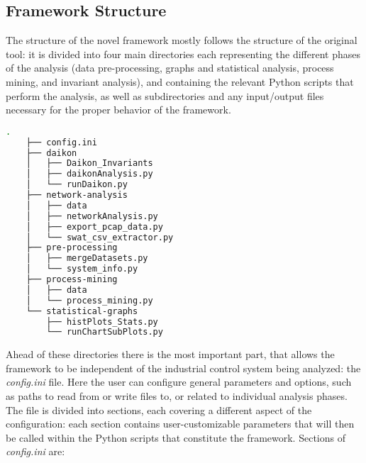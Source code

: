 \subsection{Framework Structure}
\label{subsec:4_framework_struct}
The structure of the novel framework mostly follows the structure of the original tool: it is divided into four main directories each representing the different phases of the analysis (data pre-processing, graphs and statistical analysis, process mining, and invariant analysis), and containing the relevant Python scripts that perform the analysis, as well as subdirectories and any input/output files necessary for the proper behavior of the framework.

\begin{lstlisting}[language=bash, numbers=none, caption=Novel Framework structure and Python scripts, label=lst:4_tree_command]
	.
	├── config.ini
	├── daikon
	│   ├── Daikon_Invariants
	│   ├── daikonAnalysis.py
	│   └── runDaikon.py
	├── network-analysis
	│   ├── data
	│   ├── networkAnalysis.py
	│   ├── export_pcap_data.py
	│   └── swat_csv_extractor.py
	├── pre-processing
	│   ├── mergeDatasets.py
	│   └── system_info.py
	├── process-mining
	│   ├── data
	│   └── process_mining.py
	└── statistical-graphs
	    ├── histPlots_Stats.py
	    └── runChartSubPlots.py
\end{lstlisting}

Ahead of these directories there is the most important part, that allows the framework to be independent of the industrial control system being analyzed: the \textit{config.ini} file. Here the user can configure general parameters and options, such as paths to read from or write files to, or related to individual analysis phases.\newline
The file is divided into sections, each covering a different aspect of 
the configuration: each section contains user-customizable parameters 
that will then be called within the Python scripts that constitute the framework. Sections of \textit{config.ini} are:

